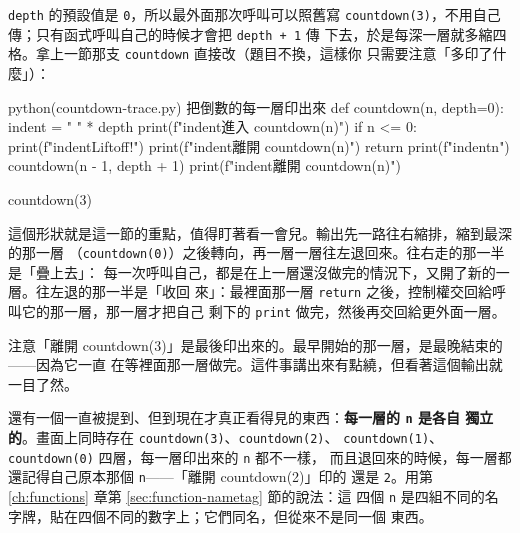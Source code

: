 \texttt{depth} 的預設值是 \texttt{0}，所以最外面那次呼叫可以照舊寫
\texttt{countdown(3)}，不用自己傳；只有函式呼叫自己的時候才會把 \texttt{depth + 1} 傳
下去，於是每深一層就多縮四格。拿上一節那支 \texttt{countdown} 直接改（題目不換，這樣你
只需要注意「多印了什麼」）：

\begin{example}{python}{(countdown-trace.py) 把倒數的每一層印出來}
def countdown(n, depth=0):
    indent = "    " * depth
    print(f"{indent}進入 countdown({n})")
    if n <= 0:
        print(f"{indent}Liftoff!")
        print(f"{indent}離開 countdown({n})")
        return
    print(f"{indent}{n}")
    countdown(n - 1, depth + 1)
    print(f"{indent}離開 countdown({n})")


countdown(3)
\end{example}


這個形狀就是這一節的重點，值得盯著看一會兒。輸出先一路往右縮排，縮到最深的那一層
（\texttt{countdown(0)}）之後轉向，再一層一層往左退回來。往右走的那一半是「疊上去」：
每一次呼叫自己，都是在上一層還沒做完的情況下，又開了新的一層。往左退的那一半是「收回
來」：最裡面那一層 \texttt{return} 之後，控制權交回給呼叫它的那一層，那一層才把自己
剩下的 \texttt{print} 做完，然後再交回給更外面一層。

注意「離開 countdown(3)」是最後印出來的。最早開始的那一層，是最晚結束的——因為它一直
在等裡面那一層做完。這件事講出來有點繞，但看著這個輸出就一目了然。

還有一個一直被提到、但到現在才真正看得見的東西：\textbf{每一層的 \texttt{n} 是各自
獨立的}。畫面上同時存在 \texttt{countdown(3)}、\texttt{countdown(2)}、
\texttt{countdown(1)}、\texttt{countdown(0)} 四層，每一層印出來的 \texttt{n} 都不一樣，
而且退回來的時候，每一層都還記得自己原本那個 \texttt{n}——「離開 countdown(2)」印的
還是 \texttt{2}。用第 \ref{ch:functions} 章第 \ref{sec:function-nametag} 節的說法：這
四個 \texttt{n} 是四組不同的名字牌，貼在四個不同的數字上；它們同名，但從來不是同一個
東西。

